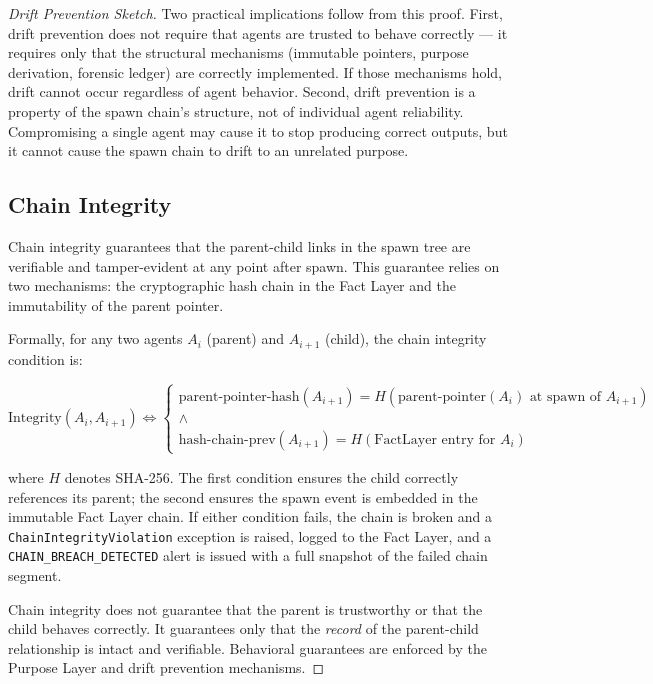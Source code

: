 \begin{proof}[Drift Prevention Sketch]
\endproof

Two practical implications follow from this proof. First, drift prevention does not require that agents are trusted to behave correctly — it requires only that the structural mechanisms (immutable pointers, purpose derivation, forensic ledger) are correctly implemented. If those mechanisms hold, drift cannot occur regardless of agent behavior. Second, drift prevention is a property of the spawn chain's structure, not of individual agent reliability. Compromising a single agent may cause it to stop producing correct outputs, but it cannot cause the spawn chain to drift to an unrelated purpose.

\subsection{Chain Integrity}

Chain integrity guarantees that the parent-child links in the spawn tree are verifiable and tamper-evident at any point after spawn. This guarantee relies on two mechanisms: the cryptographic hash chain in the Fact Layer and the immutability of the parent pointer.

Formally, for any two agents $A_i$ (parent) and $A_{i+1}$ (child), the chain integrity condition is:

\begin{equation}
\text{Integrity}(A_i, A_{i+1}) \iff
\begin{cases}
\text{parent-pointer-hash}(A_{i+1}) = H(\text{parent-pointer}(A_i) \text{ at spawn of } A_{i+1}) \\
\land \\
\text{hash-chain-prev}(A_{i+1}) = H(\text{FactLayer entry for } A_i)
\end{cases}
\end{equation}

where $H$ denotes SHA-256. The first condition ensures the child correctly references its parent; the second ensures the spawn event is embedded in the immutable Fact Layer chain. If either condition fails, the chain is broken and a \texttt{ChainIntegrityViolation} exception is raised, logged to the Fact Layer, and a \texttt{CHAIN\_BREACH\_DETECTED} alert is issued with a full snapshot of the failed chain segment.

Chain integrity does not guarantee that the parent is trustworthy or that the child behaves correctly. It guarantees only that the \textit{record} of the parent-child relationship is intact and verifiable. Behavioral guarantees are enforced by the Purpose Layer and drift prevention mechanisms.


\end{proof}
